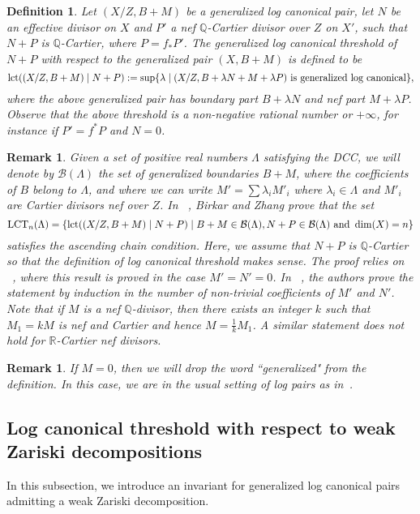 \documentclass{amsart}
\renewcommand{\qq}{\mathbb{Q}}
\newcommand{\rr}{\mathbb{R}}
\newtheorem{definition}[theorem]{Definition}
\newtheorem{remark}[theorem]{Remark}
\theoremstyle{remark}
\numberwithin{equation}{section}
\begin{document}
\begin{definition}
{\em 
Let $(X/Z,B+M)$ be a generalized log canonical pair, 
let $N$ be an effective divisor on $X$ and $P'$ a nef $\qq$-Cartier divisor over $Z$ on $X'$,
such that $N+P$ is $\qq$-Cartier, where $P=f_*P'$.
The {\em generalized log canonical threshold} of $N+P$ with respect to the generalized pair $(X,B+M)$
is defined to be
\[
{\rm lct}((X/Z,B+M)\mid N+P) :=
{\rm sup}\{ \lambda \mid (X/Z, B+ \lambda N + M+ \lambda P) \text{ is generalized log canonical} \},
\]
where the above generalized pair has boundary part $B+\lambda N$ and
nef part $M+\lambda P$.
Observe that the above threshold is a non-negative rational number or $+\infty$, for instance if $P'=f^*P$ and $N=0$.
}
\end{definition}

\begin{remark}
{\em
Given a set of positive real numbers $\Lambda$ satisfying the DCC, we will denote by $\mathcal{B}(\Lambda)$ the set
of generalized boundaries $B+M$,
where the coefficients of $B$ belong to $\Lambda$, and where we can write $M'=\sum \lambda_i M'_i$
where $\lambda_i\in \Lambda$ and $M'_i$ are Cartier divisors nef over $Z$.
In ~\cite[Theorem 1.5]{BZ16}, Birkar and Zhang prove that the set 
\[
{\rm LCT}_n(\Lambda) = \{ {\rm lct}((X/Z,B+M)\mid N+P) \mid B+M\in \mathcal{B}(\Lambda),  N+P \in \mathcal{B}(\Lambda) \text{ and } \dim(X)=n \}
\]
satisfies the  ascending chain condition. Here, we assume that $N+P$ is $\qq$-Cartier so that the definition of log canonical threshold makes sense.
The proof relies on ~\cite{HMX14}, where this result is proved in the case $M'=N'=0$.
In ~\cite{BZ16}, the authors prove the statement by induction in the number of non-trivial coefficients of $M'$ and $N'$.
Note that if $M$ is a nef $\qq$-divisor, then there exists an integer $k$ such that $M_1=kM$ is nef and Cartier and hence $M=\frac{1}{k}M_1$. A similar statement does not hold for $\rr$-Cartier nef divisors.}
\end{remark}

\begin{remark}
{\em If $M=0$, then we will drop the word ``generalized" from the definition.
In this case, we are in the usual setting of log pairs as in~\cites{KM98,HK10}.}
\end{remark}

\subsection{Log canonical threshold with respect to weak Zariski decompositions}
In this subsection, we introduce an invariant for generalized log canonical pairs admitting a weak Zariski decomposition.
\end{document}
